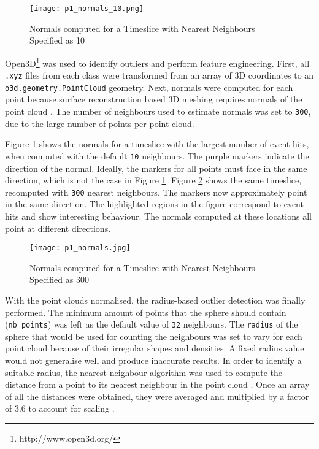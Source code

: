 \begin{figure}[ht!]
    \centering 
    \texttt{[image: p1\_normals\_10.png]}
    \caption{Normals computed for a Timeslice with Nearest Neighbours Specified as 10}
    \label{fig:p1_normals_10}
\end{figure}

Open3D\footnote{http://www.open3d.org/} was used to identify outliers and perform feature engineering. First, all \texttt{.xyz} files from each class were transformed from an array of 3D coordinates to an \texttt{o3d.geometry.PointCloud} geometry. Next, normals were computed for each point because surface reconstruction based 3D meshing requires normals of the point cloud \cite{mitra2003estimating}. The number of neighbours used to estimate normals was set to \texttt{300}, due to the large number of points per point cloud. 


Figure \ref{fig:p1_normals_10} shows the normals for a timeslice with the largest number of event hits, when computed with the default \texttt{10} neighbours. The purple markers indicate the direction of the normal. Ideally, the markers for all points must face in the same direction, which is not the case in Figure \ref{fig:p1_normals_10}. Figure \ref{fig:p1_normals} shows the same timeslice, recomputed with \texttt{300} nearest neighbours. The markers now approximately point in the same direction. The highlighted regions in the figure correspond to event hits and show interesting behaviour. The normals computed at these locations all point at different directions. 

\begin{figure}[ht!]
    \centering 
    \texttt{[image: p1\_normals.jpg]}
    \caption{Normals computed for a Timeslice with Nearest Neighbours Specified as 300}
    \label{fig:p1_normals}
\end{figure}

With the point clouds normalised, the radius-based outlier detection was finally performed. The minimum amount of points that the sphere should contain (\texttt{nb\_points}) was left as the default value of \texttt{32} neighbours. The \texttt{radius} of the sphere that would be used for counting the neighbours was set to vary for each point cloud because of their irregular shapes and densities. A fixed radius value would not generalise well and produce inaccurate results. In order to identify a suitable radius, the nearest neighbour algorithm was used to compute the distance from a point to its nearest neighbour in the point cloud \cite{cui2018flexible}. Once an array of all the distances were obtained, they were averaged and multiplied by a factor of 3.6 to account for scaling \cite{zhou2018open3d}.

